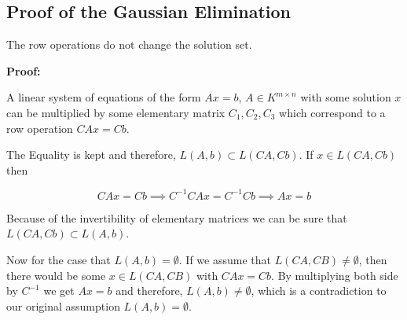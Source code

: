 

\subsection{Proof of the Gaussian Elimination}

The row operations do not change the solution set. 
\vspace{\baselineskip}

\textbf{Proof:}

A linear system of equations of the form \(Ax = b\), \(A \in K^{m \times n}\) with some solution
\(x\) can be multiplied by some elementary matrix \(C_1, C_2, C_3\) which correspond to a row 
operation \(CAx = Cb\).
\vspace{\baselineskip}

The Equality is kept and therefore, \(L(A,b) \subset L(CA, Cb)\). If \(x \in L(CA, Cb)\) then

\[
	CAx = Cb \implies C^{-1}CAx = C^{-1}Cb \implies Ax = b
\]

Because of the invertibility of elementary matrices we can be sure that  \(L(CA, Cb) \subset L(A,b) \).
\vspace{\baselineskip}

Now for the case that \(L(A,b) = \emptyset\). If we assume that \(L(CA,CB) \ne \emptyset \), then 
there would be some \(x \in L(CA,CB)\) with \(CAx = Cb\). By multiplying both side by \(C^{-1}\) we 
get \(Ax = b\) and therefore, \(L(A, b) \ne \emptyset \),  which is a contradiction to our original
assumption  \(L(A,b) = \emptyset\).

